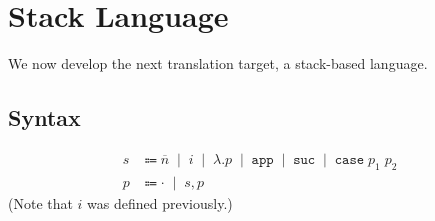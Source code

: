 \documentclass[12pt]{article}
\newcommand{\alt}{\;\; | \;\;}
\newcommand{\defi}{\Coloneqq}
\newcommand{\nil}{\cdot}
\newcommand{\h}[1]{\hat{#1}}
\renewcommand{\rule}{\textsc}
\newcommand{\sg}{\sigma}
\renewcommand{\phi}{\varphi}
\newcommand{\De}{\Delta}
\newcommand{\E}{\mathcal{E}}
\newcommand{\C}{\mathcal{C}}
\newcommand{\D}{\mathcal{D}}
\newcommand{\T}{\mathcal{T}}
\newcommand{\n}[1]{\overline{#1}}
\newcommand{\lam}[2]{\lambda #1. #2}
\newcommand{\app}{\;}
\newcommand{\sub}[3]{#1[#2/#3]}
\newcommand{\subs}[2]{#1[#2]}
\newcommand{\wo}{\backslash}
\newcommand{\sapp}{\mathtt{app}}
\newcommand{\ssuc}{\mathtt{suc}}
\newcommand{\scase}[2]{\mathtt{case} \; #1 \; #2}
\newcommand{\ninf}[1]{\AxiomC{#1}}
\newcommand{\uinf}[1]{\UnaryInfC{#1}}
\newcommand{\binf}[1]{\BinaryInfC{#1}}
\newcommand{\tinf}[1]{\TrinaryInfC{#1}}
\newcommand{\prem}[2]{\noLine \ninf{$#1$} \uinf{#2}}
\newcommand{\tra}[4]{\ensuremath{#1; #2 \vdash #3 \rhd #4}}
\newcommand{\ev}[2]{\ensuremath{#1 \downarrow #2}}
\newcommand{\hev}[3]{\ensuremath{#1 \vdash #2 \Downarrow #3}}
\newcommand{\cor}[2]{\ensuremath{#1 \rightsquigarrow #2}}
\newcommand{\comp}[3]{\ensuremath{#1 \stackrel{#2}{\rightsquigarrow} #3}}
\newcommand{\e}{e} %
\renewcommand{\c}{c} %
\renewcommand{\b}{b} %
\renewcommand{\v}{v} %
\newcommand{\s}{s}
\renewcommand{\ss}{p} %
\renewcommand{\h}{h}
\newcommand{\B}{B}
\newenvironment{proof}[1][Proof]{
\paragraph{#1}
}{
\begin{flushright}
$\blacksquare$
\end{flushright}
}
\begin{document}
%
%
%
%
%
%

\section*{Stack Language}

We now develop the next translation target, a stack-based language.

\subsection*{Syntax}
\begin{align*}
  \s &\defi \n{n} \alt i \alt \lam{}{\ss} \alt \sapp \alt \ssuc \alt \scase{\ss_1}{\ss_2} \\
  \ss &\defi \nil \alt \s, \ss
\end{align*}
(Note that $i$ was defined previously.)
\end{document}
